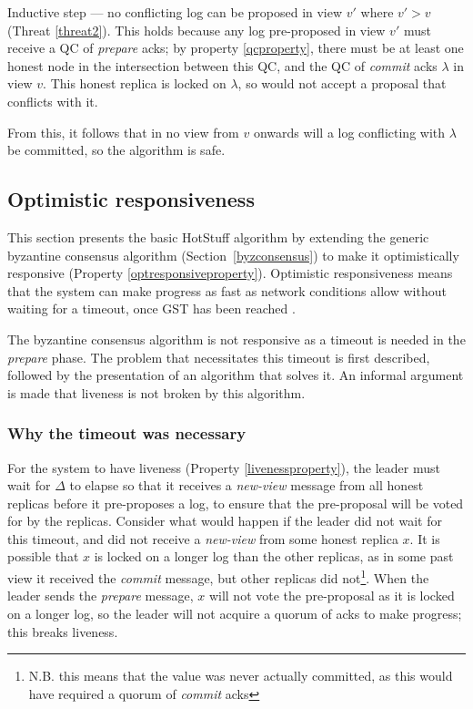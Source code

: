 Inductive step --- no conflicting log can be proposed in view $v'$ where $v' > v$ (Threat \ref{threat2}). This holds because any log pre-proposed in view $v'$ must receive a QC of \textit{prepare} acks; by property \ref{qcproperty}, there must be at least one honest node in the intersection between this QC, and the QC of \textit{commit} acks $\lambda$ in view $v$. This honest replica is locked on $\lambda$, so would not accept a proposal that conflicts with it.

From this, it follows that in no view from $v$ onwards will a log conflicting with $\lambda$ be committed, so the algorithm is safe.

\subsection{Optimistic responsiveness} \label{optresponsive}
This section presents the basic HotStuff algorithm by extending the generic byzantine consensus algorithm (Section~\ref{byzconsensus}) to make it optimistically responsive (Property \ref{optresponsiveproperty}). Optimistic responsiveness means that the system can make progress as fast as network conditions allow without waiting for a timeout, once GST has been reached \cite{passThunderellaBlockchainsOptimistic2018}.

The byzantine consensus algorithm is not responsive as a timeout is needed in the \textit{prepare} phase. The problem that necessitates this timeout is first described, followed by the presentation of an algorithm that solves it. An informal argument is made that liveness is not broken by this algorithm.

\subsubsection{Why the timeout was necessary}
For the system to have liveness (Property \ref{livenessproperty}), the leader must wait for $\Delta$ to elapse so that it receives a \textit{new-view} message from all honest replicas before it pre-proposes a log, to ensure that the pre-proposal will be voted for by the replicas. Consider what would happen if the leader did not wait for this timeout, and did not receive a \textit{new-view} from some honest replica $x$. It is possible that $x$ is locked on a longer log than the other replicas, as in some past view it received the \textit{commit} message, but other replicas did not\footnote{N.B. this means that the value was never actually committed, as this would have required a quorum of \textit{commit} acks}. When the leader sends the \textit{prepare} message, $x$ will not vote the pre-proposal as it is locked on a longer log, so the leader will not acquire a quorum of acks to make progress; this breaks liveness.

